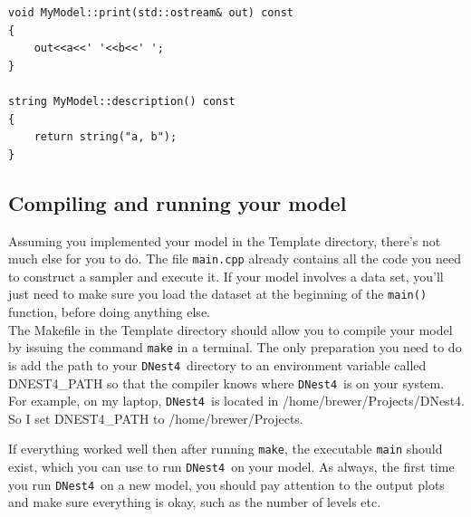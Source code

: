 \documentclass[a4paper, 11pt]{article}
\newcommand{\dnest}{{\tt DNest4}}
\begin{document}
\begin{framed}
\begin{verbatim}
void MyModel::print(std::ostream& out) const
{
    out<<a<<' '<<b<<' ';
}

string MyModel::description() const
{
    return string("a, b");
}
\end{verbatim}
\end{framed}

\subsection{Compiling and running your model}
Assuming you implemented your model in the Template directory, there's not
much else for you to do. The file {\tt main.cpp} already contains all the code
you need to construct a sampler and execute it. If your model involves a data
set, you'll just need to make sure you load the dataset at the beginning
of the {\tt main()} function, before doing anything else.\\

The Makefile in the Template directory should allow you to compile your model
by issuing the command {\tt make} in a terminal. The only preparation you need
to do is add the path to your \dnest~directory to an environment variable called
DNEST4\_PATH so that the compiler knows where \dnest~is on your system.
For example, on my laptop, \dnest~is located in /home/brewer/Projects/DNest4.
So I set DNEST4_PATH to /home/brewer/Projects.

If everything worked well then after running {\tt make},
the executable {\tt main} should exist, which you can use to run
\dnest~on your model. As always, the first time you run \dnest~on a new model,
you should pay attention to the output plots and make sure everything is okay,
such as the number of levels etc.


\end{document}
